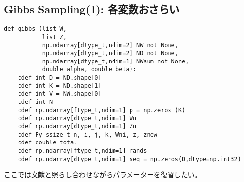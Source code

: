 \documentclass[uplatex]{jsarticle}
\begin{document}
\subsection{Gibbs Sampling(1): 各変数おさらい}

\begin{lstlisting}
def gibbs (list W,
           list Z,
           np.ndarray[dtype_t,ndim=2] NW not None,
           np.ndarray[dtype_t,ndim=2] ND not None,
           np.ndarray[dtype_t,ndim=1] NWsum not None,
           double alpha, double beta):
    cdef int D = ND.shape[0]
    cdef int K = ND.shape[1]
    cdef int V = NW.shape[0]
    cdef int N
    cdef np.ndarray[ftype_t,ndim=1] p = np.zeros (K)
    cdef np.ndarray[dtype_t,ndim=1] Wn
    cdef np.ndarray[dtype_t,ndim=1] Zn
    cdef Py_ssize_t n, i, j, k, Wni, z, znew
    cdef double total
    cdef np.ndarray[ftype_t,ndim=1] rands
    cdef np.ndarray[dtype_t,ndim=1] seq = np.zeros(D,dtype=np.int32)
\end{lstlisting}

ここでは文献\cite{murphy}と照らし合わせながらパラメーターを復習したい。


\protect\newpage
\end{document}
